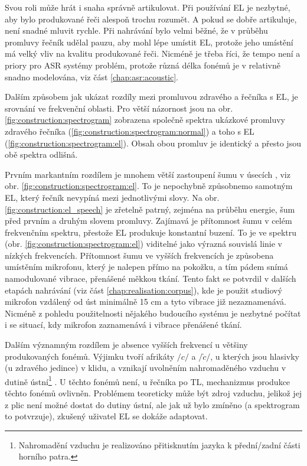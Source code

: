 Svou roli může hrát i snaha správně artikulovat. Při používání EL je nezbytné, aby bylo produkované řeči alespoň trochu rozumět. A pokud se dobře artikuluje, není snadné mluvit rychle. Při nahrávání bylo velmi běžné, že v průběhu promluvy řečník udělal pauzu, aby mohl lépe umístit EL, protože jeho umístění má velký vliv na kvalitu produkované řeči. Nicméně je třeba říci, že tempo není a priory pro ASR systémy problém, protože různá délka fonémů je v relativně snadno modelována, viz část \ref{chap:asr:acoustic}.

Dalším způsobem jak ukázat rozdíly mezi promluvou zdravého a řečníka s EL, je srovnání ve frekvenční oblasti. Pro větší názornost jsou na obr. \ref{fig:construction:spectrogram} zobrazena společně spektra ukázkové promluvy zdravého řečníka (\ref{fig:construction:spectrogram:normal}) a toho s EL (\ref{fig:construction:spectrogram:el}). Obsah obou promluv je identický a přesto jsou obě spektra odlišná.

Prvním markantním rozdílem je mnohem větší zastoupení šumu v úsecích , viz obr. \ref{fig:construction:spectrogram:el}. To je nepochybně způsobnemo samotným EL, který řečník nevypíná mezi jednotlivými slovy. Na obr. \ref{fig:construction:el_speech} je zřetelně patrný, zejména na průběhu energie, šum před prvním a druhým slovem promluvy. Zajímavá je přítomnost šumu v celém frekvenčním spektru, přestože EL produkuje konstantní buzení. To je ve spektru (obr. \ref{fig:construction:spectrogram:el}) viditelné jako výrazná souvislá linie v nízkých frekvencích. Přítomnost šumu ve vyšších frekvencích je způsobena umístěním mikrofonu, který je nalepen přímo na pokožku, a tím pádem snímá namodulované vibrace, přenášené měkkou tkání. Tento fakt se potvrdil v dalších etapách nahrávání (viz část \ref{chap:realisation:corpus}), kde je použit studiový mikrofon vzdálený od úst minimálně 15 cm a tyto vibrace již nezaznamenává. Nicméně z pohledu použitelnosti nějakého budoucího systému je nezbytné počítat i se situací, kdy mikrofon zaznamenává i vibrace přenášené tkání.

Dalším významným rozdílem je absence vyšších frekvencí u většiny produkovaných fonémů. Výjimku tvoří afrikáty $/c/$ a $/\check{c}/$, u kterých jsou hlasivky (u zdravého jedince) v klidu, a vznikají uvolněním nahromaděného vzduchu v dutině ústní\footnote{Nahromadění vzduchu je realizováno přitisknutím jazyka k přední/zadní části horního patra.} \cite{Psutka2006}. U těchto fonémů není, u  řečníka po TL, mechanizmus produkce těchto fonémů ovlivněn. Problémem teoreticky může být zdroj vzduchu, jelikož jej z plic není možné dostat do dutiny ústní, ale jak už bylo zmíněno (a spektrogram to potvrzuje), zkušený uživatel EL se dokáže adaptovat.

